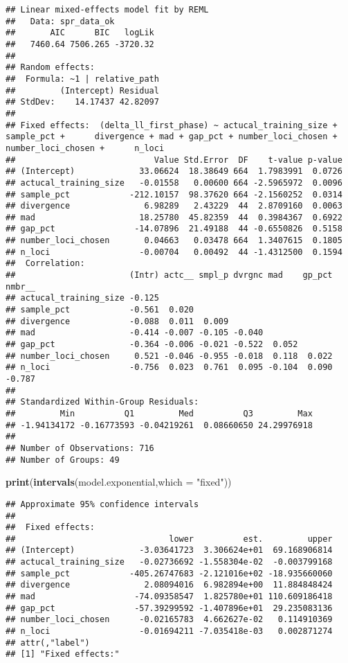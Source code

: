 \documentclass[
]{article}
\newenvironment{Shaded}{\begin{snugshade}}{\end{snugshade}}
\newcommand{\DataTypeTok}[1]{\textcolor[rgb]{0.13,0.29,0.53}{#1}}
\newcommand{\KeywordTok}[1]{\textcolor[rgb]{0.13,0.29,0.53}{\textbf{#1}}}
\newcommand{\NormalTok}[1]{#1}
\newcommand{\StringTok}[1]{\textcolor[rgb]{0.31,0.60,0.02}{#1}}
\begin{document}
\begin{verbatim}
## Linear mixed-effects model fit by REML
##   Data: spr_data_ok 
##       AIC      BIC   logLik
##   7460.64 7506.265 -3720.32
## 
## Random effects:
##  Formula: ~1 | relative_path
##         (Intercept) Residual
## StdDev:    14.17437 42.82097
## 
## Fixed effects:  (delta_ll_first_phase) ~ actucal_training_size + sample_pct +      divergence + mad + gap_pct + number_loci_chosen + number_loci_chosen +      n_loci 
##                            Value Std.Error  DF    t-value p-value
## (Intercept)             33.06624  18.38649 664  1.7983991  0.0726
## actucal_training_size   -0.01558   0.00600 664 -2.5965972  0.0096
## sample_pct            -212.10157  98.37620 664 -2.1560252  0.0314
## divergence               6.98289   2.43229  44  2.8709160  0.0063
## mad                     18.25780  45.82359  44  0.3984367  0.6922
## gap_pct                -14.07896  21.49188  44 -0.6550826  0.5158
## number_loci_chosen       0.04663   0.03478 664  1.3407615  0.1805
## n_loci                  -0.00704   0.00492  44 -1.4312500  0.1594
##  Correlation: 
##                       (Intr) actc__ smpl_p dvrgnc mad    gp_pct nmbr__
## actucal_training_size -0.125                                          
## sample_pct            -0.561  0.020                                   
## divergence            -0.088  0.011  0.009                            
## mad                   -0.414 -0.007 -0.105 -0.040                     
## gap_pct               -0.364 -0.006 -0.021 -0.522  0.052              
## number_loci_chosen     0.521 -0.046 -0.955 -0.018  0.118  0.022       
## n_loci                -0.756  0.023  0.761  0.095 -0.104  0.090 -0.787
## 
## Standardized Within-Group Residuals:
##         Min          Q1         Med          Q3         Max 
## -1.94134172 -0.16773593 -0.04219261  0.08660650 24.29976918 
## 
## Number of Observations: 716
## Number of Groups: 49
\end{verbatim}

\begin{Shaded}
\begin{Highlighting}[]
\KeywordTok{print}\NormalTok{(}\KeywordTok{intervals}\NormalTok{(model.exponential,}\DataTypeTok{which =} \StringTok{"fixed"}\NormalTok{))}
\end{Highlighting}
\end{Shaded}

\begin{verbatim}
## Approximate 95% confidence intervals
## 
##  Fixed effects:
##                               lower          est.         upper
## (Intercept)             -3.03641723  3.306624e+01  69.168906814
## actucal_training_size   -0.02736692 -1.558304e-02  -0.003799168
## sample_pct            -405.26747683 -2.121016e+02 -18.935660060
## divergence               2.08094016  6.982894e+00  11.884848424
## mad                    -74.09358547  1.825780e+01 110.609186418
## gap_pct                -57.39299592 -1.407896e+01  29.235083136
## number_loci_chosen      -0.02165783  4.662627e-02   0.114910369
## n_loci                  -0.01694211 -7.035418e-03   0.002871274
## attr(,"label")
## [1] "Fixed effects:"
\end{verbatim}
\end{document}
